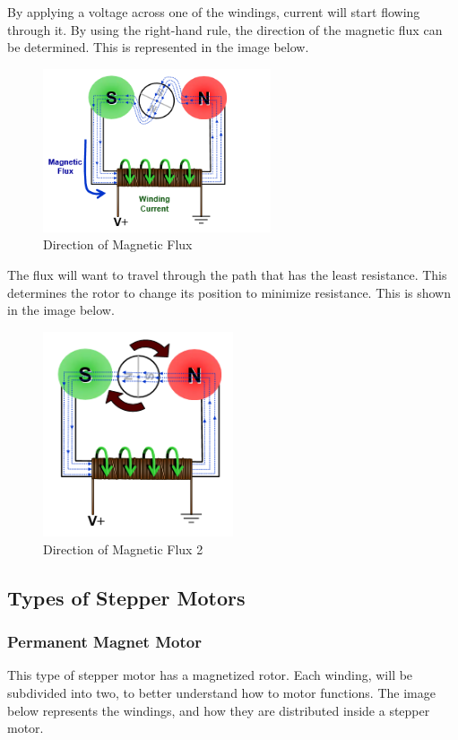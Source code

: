 By applying a voltage across one of the windings, current will start flowing through it. By using the right-hand rule, the direction of the magnetic flux can be determined. This is represented in the image below.

\begin{figure}[h]
	\centering
	\includegraphics[width=0.6\textwidth]{figures/move/motor3.png}
	\caption{Direction of Magnetic Flux}
\end{figure}

The flux will want to travel through the path that has the least resistance. This determines the rotor to change its position to minimize resistance. This is shown in the image below.

\begin{figure}[h]
	\centering
	\includegraphics[width=0.5\textwidth]{figures/move/motor4.png}
	\caption{Direction of Magnetic Flux 2}
\end{figure}
\subsection{Types of Stepper Motors}
\subsubsection{Permanent Magnet Motor}
This type of stepper motor has a magnetized rotor. Each winding, will be subdivided into two, to better understand how to motor functions. The image below represents the windings, and how they are distributed inside a stepper motor.

